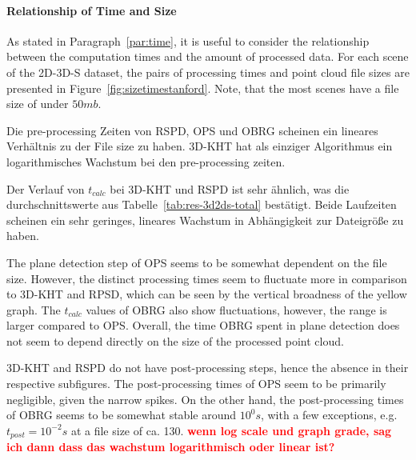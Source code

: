 \documentclass[main.tex]{subfiles}
\begin{document}
\paragraph{Relationship of Time and Size}
As stated in Paragraph~\ref{par:time}, it is useful to consider the relationship between the computation times and the amount of
processed data. For each scene of the 2D-3D-S dataset, the pairs of 
processing times and point cloud file sizes are presented in Figure~\ref{fig:sizetimestanford}. Note, that the most scenes have a 
file size of under $50mb$.


Die pre-processing Zeiten von RSPD, OPS und OBRG scheinen ein lineares Verhältnis zu der File size zu haben. 3D-KHT hat als einziger Algorithmus
ein logarithmisches Wachstum bei den pre-processing zeiten.

Der Verlauf von $t_{calc}$ bei 3D-KHT und RSPD ist sehr ähnlich, was die durchschnittswerte aus Tabelle~\ref{tab:res-3d2ds-total} bestätigt.
Beide Laufzeiten scheinen ein sehr geringes, lineares Wachstum in Abhängigkeit zur Dateigröße zu haben.

The plane detection step of OPS seems to be somewhat dependent on the file size. However, the distinct processing times 
seem to fluctuate more in comparison to 3D-KHT and RPSD, which can be seen by the vertical broadness of the yellow graph.
The $t_{calc}$ values of OBRG also show fluctuations, however, the range is larger compared to OPS. 
Overall, the time OBRG spent in plane detection does not seem to depend directly on the size of the processed point cloud.

3D-KHT and RSPD do not have post-processing steps, hence the absence in their respective subfigures. 
The post-processing times of OPS seem to be primarily negligible, given the narrow spikes. On the other hand, the post-processing times
of OBRG seems to be somewhat stable around $10^0s$, with a few exceptions, e.g. $t_{post}=10^{-2}s$ at a file size of ca. 130.
\textbf{\textcolor{red}{wenn log scale und graph grade, sag ich dann dass das wachstum logarithmisch oder linear ist?}}
\end{document}
